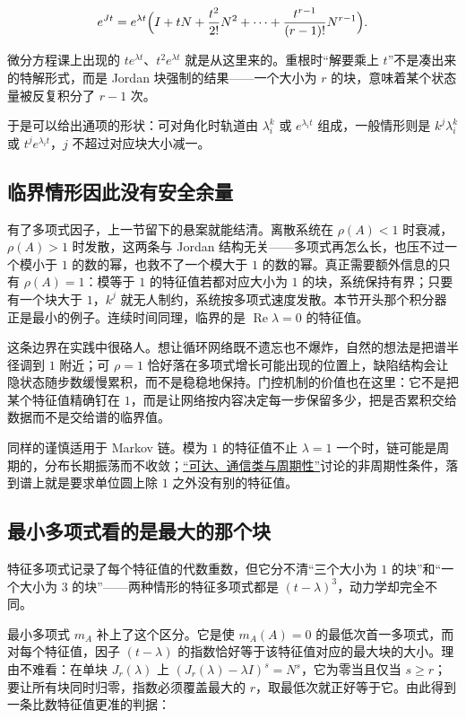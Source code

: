 \[
e^{Jt}=e^{\lambda t}\Bigl(I+tN+\frac{t^2}{2!}N^2+\cdots+\frac{t^{r-1}}{(r-1)!}N^{r-1}\Bigr).
\]

微分方程课上出现的 \(te^{\lambda t}\)、\(t^2e^{\lambda t}\) 就是从这里来的。重根时``解要乘上 \(t\)''不是凑出来的特解形式，而是 Jordan 块强制的结果——一个大小为 \(r\) 的块，意味着某个状态量被反复积分了 \(r-1\) 次。

于是可以给出通项的形状：可对角化时轨道由 \(\lambda_i^k\) 或 \(e^{\lambda_it}\) 组成，一般情形则是 \(k^{j}\lambda_i^k\) 或 \(t^je^{\lambda_it}\)，\(j\) 不超过对应块大小减一。

\subsection{临界情形因此没有安全余量}

有了多项式因子，上一节留下的悬案就能结清。离散系统在 \(\rho(A)<1\) 时衰减，\(\rho(A)>1\) 时发散，这两条与 Jordan 结构无关——多项式再怎么长，也压不过一个模小于 \(1\) 的数的幂，也救不了一个模大于 \(1\) 的数的幂。真正需要额外信息的只有 \(\rho(A)=1\)：模等于 \(1\) 的特征值若都对应大小为 \(1\) 的块，系统保持有界；只要有一个块大于 \(1\)，\(k^{j}\) 就无人制约，系统按多项式速度发散。本节开头那个积分器正是最小的例子。连续时间同理，临界的是 \(\operatorname{Re}\lambda=0\) 的特征值。

这条边界在实践中很硌人。想让循环网络既不遗忘也不爆炸，自然的想法是把谱半径调到 \(1\) 附近；可 \(\rho=1\) 恰好落在多项式增长可能出现的位置上，缺陷结构会让隐状态随步数缓慢累积，而不是稳稳地保持。门控机制的价值也在这里：它不是把某个特征值精确钉在 \(1\)，而是让网络按内容决定每一步保留多少，把是否累积交给数据而不是交给谱的临界值。

同样的谨慎适用于 Markov 链。模为 \(1\) 的特征值不止 \(\lambda=1\) 一个时，链可能是周期的，分布长期振荡而不收敛；\hyperref[sec:06-Random-Processes/03-Markov-Chains/02]{``可达、通信类与周期性''}讨论的非周期性条件，落到谱上就是要求单位圆上除 \(1\) 之外没有别的特征值。

\subsection{最小多项式看的是最大的那个块}

特征多项式记录了每个特征值的代数重数，但它分不清``三个大小为 \(1\) 的块''和``一个大小为 \(3\) 的块''——两种情形的特征多项式都是 \((t-\lambda)^3\)，动力学却完全不同。

最小多项式 \(m_A\) 补上了这个区分。它是使 \(m_A(A)=0\) 的最低次首一多项式，而对每个特征值，因子 \((t-\lambda)\) 的指数恰好等于该特征值对应的最大块的大小。理由不难看：在单块 \(J_r(\lambda)\) 上 \((J_r(\lambda)-\lambda I)^s=N^s\)，它为零当且仅当 \(s\ge r\)；要让所有块同时归零，指数必须覆盖最大的 \(r\)，取最低次就正好等于它。由此得到一条比数特征值更准的判据：

